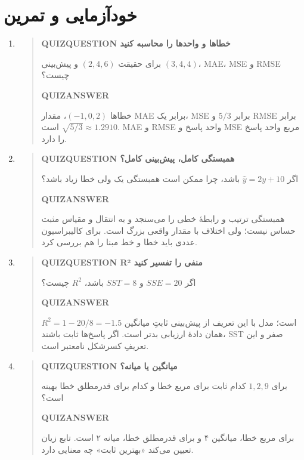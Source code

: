 \section{خودآزمایی و تمرین}
\begin{enumerate}
\item\begin{quote}\textbf{QUIZQUESTION خطاها و واحدها را محاسبه کنید}\par 
برای حقیقت $(2,4,6)$ و پیش‌بینی $(3,4,4)$، MAE، MSE و RMSE چیست؟
\par\textbf{QUIZANSWER}\par خطاها $(-1,0,2)$، مقدار MAE برابر یک، MSE برابر $5/3$ و RMSE برابر $\sqrt{5/3}\approx1.2910$ است. MAE و RMSE واحد پاسخ و MSE مربع واحد پاسخ را دارد.\par 
\end{quote}
\item\begin{quote}\textbf{QUIZQUESTION همبستگی کامل، پیش‌بینی کامل؟}\par 
اگر $\widehat y=2y+10$ باشد، چرا ممکن است همبستگی یک ولی خطا زیاد باشد؟
\par\textbf{QUIZANSWER}\par همبستگی ترتیب و رابطهٔ خطی را می‌سنجد و به انتقال و مقیاس مثبت حساس نیست؛ ولی اختلاف با مقدار واقعی بزرگ است. برای کالیبراسیون عددی باید خطا و خط مبنا را هم بررسی کرد.\par 
\end{quote}
\item\begin{quote}\textbf{QUIZQUESTION R² منفی را تفسیر کنید}\par 
اگر $SSE=20$ و $SST=8$ باشد، $R^2$ چیست؟
\par\textbf{QUIZANSWER}\par $R^2=1-20/8=-1.5$ است؛ مدل با این تعریف از پیش‌بینی ثابتِ میانگین همان دادهٔ ارزیابی بدتر است. اگر پاسخ‌ها ثابت باشند، SST صفر و این تعریفِ کسرشکل نامعتبر است.\par 
\end{quote}
\item\begin{quote}\textbf{QUIZQUESTION میانگین یا میانه؟}\par 
برای $1,2,9$ کدام ثابت برای مربع خطا و کدام برای قدرمطلق خطا بهینه است؟
\par\textbf{QUIZANSWER}\par برای مربع خطا، میانگین ۴ و برای قدرمطلق خطا، میانه ۲ است. تابع زیان تعیین می‌کند «بهترین ثابت» چه معنایی دارد.\par 

\end{quote}
\end{enumerate}
